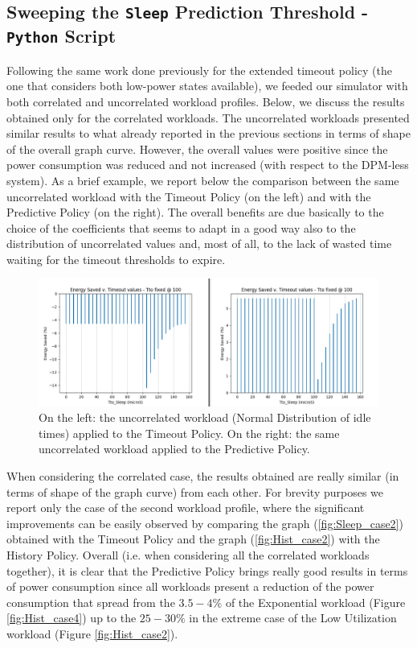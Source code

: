 \documentclass[a4paper]{article}
\begin{document}
    \subsection{Sweeping the \texttt{Sleep} Prediction Threshold - \texttt{Python} Script}
        Following the same work done previously for the extended timeout policy (the one that considers both low-power states available), we feeded our simulator with both correlated and uncorrelated workload profiles. Below, we discuss the results obtained only for the correlated workloads.
        The uncorrelated workloads presented similar results to what already reported in the previous sections in terms of shape of the overall graph curve. However, the overall values were positive since the power consumption was reduced and not increased (with respect to the DPM-less system).
        As a brief example, we report below the comparison between the same uncorrelated workload with the Timeout Policy (on the left) and with the Predictive Policy (on the right). The overall benefits are due basically to the choice of the coefficients that seems to adapt in a good way also to the distribution of uncorrelated values and, most of all, to the lack of wasted time waiting for the timeout thresholds to expire.

        \begin{figure}[htp]
            \centering
            \includegraphics[width=1 \columnwidth]{./screenshots/UncorrelatedComparison.png}
            \caption{
                    \label{fig:UncorrelatedComparison}
                    On the left: the uncorrelated workload (Normal Distribution of idle times) applied to the Timeout Policy.
                    On the right: the same uncorrelated workload applied to the Predictive Policy.
            }
        \end{figure}

        When considering the correlated case, the results obtained are really similar (in terms of shape of the graph curve) from each other. For brevity purposes we report only the case of the second workload profile, where the significant improvements can be easily observed by comparing the graph (\ref{fig:Sleep_case2}) obtained with the Timeout Policy and the graph (\ref{fig:Hist_case2}) with the History Policy.
        Overall (i.e. when considering all the correlated workloads together), it is clear that the Predictive Policy brings really good results in terms of power consumption since all workloads present a reduction of the power consumption that spread from the $3.5-4 \%$ of the Exponential workload (Figure \ref{fig:Hist_case4}) up to the $25-30\%$ in the extreme case of the Low Utilization workload (Figure \ref{fig:Hist_case2}).
\end{document}
